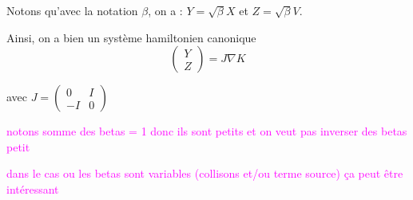 \documentclass[a4paper,11pt]{article}
\newcommand{\carybe}[1]{ \textcolor{magenta}{#1}}
\begin{document}
Notons qu'avec la notation $\beta$, on a : $Y = \sqrt{\beta} X$ et $Z = \sqrt{\beta}V$.

Ainsi, on a bien un système hamiltonien canonique
$$\left( \begin{array}{cc}
 Y \\ Z
\end{array} \right) = J \nabla K
$$

avec $J = \left( \begin{array}{cc}
 0 & I \\ -I & 0
\end{array} \right)$

\carybe{notons somme des betas = 1 donc ils sont petits et on veut pas inverser des betas petit}

\carybe{dans le cas ou les betas sont variables (collisons et/ou terme source) ça peut être intéressant}
\end{document}
